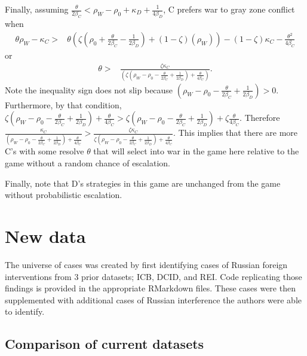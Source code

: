 \documentclass[
]{article}
\begin{document}
Finally, assuming \(\frac{\theta}{2\beta_{C}}<\rho_{W}-\rho_{0}+\kappa_{D}+\frac{1}{4\beta_{D}}\), C prefers war to gray zone conflict when
\begin{align*}
  \theta\rho_{W}-\kappa_{C}> & \theta\left(\zeta\left(\rho_{0}+\frac{\theta}{2\beta_{C}}-\frac{1}{2\beta_{D}}\right)+(1-\zeta)\left(\rho_{W}\right)\right)-(1-\zeta)\kappa_{C}-\frac{\theta^{2}}{4\beta_{C}}
  \end{align*}
or
\begin{align*}
  \theta> & \frac{\zeta\kappa_{C}}{\left(\zeta\left(\rho_{W}-\rho_{0}-\frac{\theta}{2\beta_{C}}+\frac{1}{2\beta_{D}}\right)+\frac{\theta}{4\beta_{C}}\right)}.
  \end{align*}
Note the inequality sign does not slip because \(\left(\rho_{W}-\rho_{0}-\frac{\theta}{2\beta_{C}}+\frac{1}{2\beta_{D}}\right)>0\). Furthermore, by that condition, \(\zeta\left(\rho_{W}-\rho_{0}-\frac{\theta}{2\beta_{C}}+\frac{1}{2\beta_{D}}\right)+\frac{\theta}{4\beta_{C}}>\zeta\left(\rho_{W}-\rho_{0}-\frac{\theta}{2\beta_{C}}+\frac{1}{2\beta_{D}}\right)+\zeta\frac{\theta}{4\beta_{C}}\). Therefore \(\frac{\kappa_{C}}{\left(\rho_{W}-\rho_{0}-\frac{\theta}{2\beta_{C}}+\frac{1}{2\beta_{D}}\right)+\frac{\theta}{4\beta_{C}}}>\frac{\zeta\kappa_{C}}{\zeta\left(\rho_{W}-\rho_{0}-\frac{\theta}{2\beta_{C}}+\frac{1}{2\beta_{D}}\right)+\frac{\theta}{4\beta_{C}}}\). This implies that there are more C's with some resolve \(\theta\) that will select into war in the game here relative to the game without a random chance of escalation.

Finally, note that D's strategies in this game are unchanged from the game without probabilistic escalation.

\hypertarget{new-data}{%
\section{New data}\label{new-data}}

The universe of cases was created by first identifying cases of Russian foreign interventions from 3 prior datasets; ICB, DCID, and REI. Code replicating those findings is provided in the appropriate RMarkdown files. These cases were then supplemented with additional cases of Russian interference the authors were able to identify.

\hypertarget{comparison-of-current-datasets}{%
\subsection{Comparison of current datasets}\label{comparison-of-current-datasets}}
\end{document}
